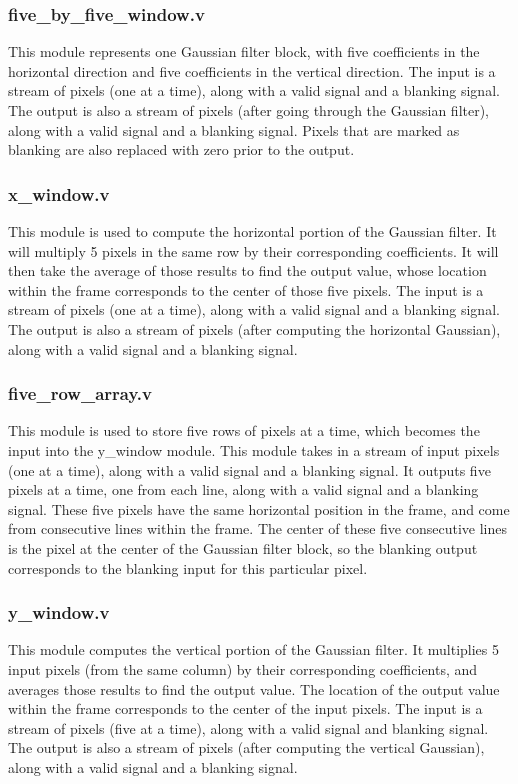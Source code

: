 \documentclass[11pt]{article}
\begin{document}
\subsubsection{five\_by\_five\_window.v}
This module represents one Gaussian filter block, with five coefficients in the 
horizontal direction and five coefficients in the vertical direction. The input 
is a stream of pixels (one at a time), along with a valid signal and a blanking 
signal. The output is also a stream of pixels (after going through the Gaussian 
filter), along with a valid signal and a blanking signal. Pixels that are 
marked as blanking are also replaced with zero prior to the output.

\subsubsection{x\_window.v}
This module is used to compute the horizontal portion of the Gaussian filter. 
It will multiply 5 pixels in the same row by their corresponding coefficients. 
It will then take the average of those results to find the output value, whose 
location within the frame corresponds to the center of those five pixels. The 
input is a stream of pixels (one at a time), along with a valid signal and a 
blanking signal. The output is also a stream of pixels (after computing the 
horizontal Gaussian), along with a valid signal and a blanking signal.

\subsubsection{five\_row\_array.v}
This module is used to store five rows of pixels at a time, which becomes the 
input into the y\_window module. This module takes in a stream of input pixels 
(one at a time), along with a valid signal and a blanking signal. It outputs 
five pixels at a time, one from each line, along with a valid signal and a 
blanking signal. These five pixels have the same horizontal position in the 
frame, and come from consecutive lines within the frame. The center of these 
five consecutive lines is the pixel at the center of the Gaussian filter block, 
so the blanking output corresponds to the blanking input for this particular 
pixel.

\subsubsection{y\_window.v}
This module computes the vertical portion of the Gaussian filter. It multiplies 
5 input pixels (from the same column) by their corresponding coefficients, and 
averages those results to find the output value. The location of the output 
value within the frame corresponds to the center of the input pixels. The input 
is a stream of pixels (five at a time), along with a valid signal and blanking 
signal. The output is also a stream of pixels (after computing the vertical 
Gaussian), along with a valid signal and a blanking signal.
\end{document}
